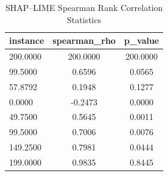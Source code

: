 \begin{table}
\centering
\caption{SHAP–LIME Spearman Rank Correlation Statistics}
\label{tab:agreement}
\begin{tabular}{lcc}
\toprule
instance & spearman_rho & p_value \\
\midrule
200.0000 & 200.0000 & 200.0000 \\
99.5000 & 0.6596 & 0.0565 \\
57.8792 & 0.1948 & 0.1277 \\
0.0000 & -0.2473 & 0.0000 \\
49.7500 & 0.5645 & 0.0011 \\
99.5000 & 0.7006 & 0.0076 \\
149.2500 & 0.7981 & 0.0444 \\
199.0000 & 0.9835 & 0.8445 \\
\bottomrule
\end{tabular}
\end{table}
